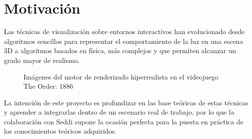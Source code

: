 







\section{Motivaci\'on}
Las t\'ecnicas de visualizaci\'on sobre entornos interactivos han evolucionado desde algoritmos sencillos para representar el comportamiento
de la luz en una escena 3D a algoritmos basados en f\'isica, m\'as complejos y que permiten alcanzar un grado mayor de realismo.

\begin{figure}[H]
    \vspace{0.5cm}
    \centering
    \caption{Im\'agenes del motor de renderizado hiperrealista en el videojuego The Order: 1886 \autocite{theorder}}
    \vspace{0.5cm}
\end{figure}

La intenci\'on de este proyecto es profundizar en las base te\'oricas de estas t\'ecnicas y aprender a integrarlas
dentro de un escenario real de trabajo, por lo que la colaboraci\'on con Seddi supone la ocasi\'on perfecta para la puesta en pr\'actica
de los conocimientos te\'oricos adquiridos.\\

